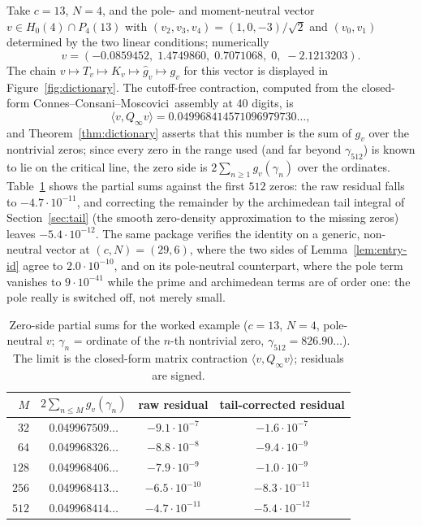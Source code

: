 \documentclass[11pt]{article}
\theoremstyle{plain}
\theoremstyle{definition}
\theoremstyle{remark}
\newcommand{\ccm}{Connes--Consani--Moscovici}
\newcommand{\wh}{\widehat}
\newcommand{\Qinf}{Q_{\infty}}
\begin{document}
Take $c=13$, $N=4$, and the pole- and moment-neutral vector
$v\in H_0(4)\cap P_4(13)$ with $(v_2,v_3,v_4)=(1,0,-3)/\sqrt2$ and
$(v_0,v_1)$ determined by the two linear conditions; numerically
\[
 v=(-0.0859452,\;1.4749860,\;0.7071068,\;0,\;-2.1213203).
\]
The chain $v\mapsto T_v\mapsto K_v\mapsto\wh g_v\mapsto g_v$ for this vector
is displayed in Figure~\ref{fig:dictionary}.  The cutoff-free contraction,
computed from the closed-form \ccm\ assembly at 40 digits, is
\[
 \langle v,\Qinf v\rangle
 =0.049968414571096979730\ldots,
\]
and Theorem~\ref{thm:dictionary} asserts that this number is the sum of
$g_v$ over the nontrivial zeros; since every zero in the range used (and far
beyond $\gamma_{512}$) is known to lie on the critical line, the zero side is
$2\sum_{n\ge1}g_v(\gamma_n)$ over the ordinates.
Table~\ref{tab:zeroside} shows the partial sums against the first $512$
zeros: the raw residual falls to $-4.7\cdot10^{-11}$, and correcting the
remainder by the archimedean tail integral of Section~\ref{sec:tail} (the
smooth zero-density approximation to the missing zeros) leaves
$-5.4\cdot10^{-12}$.  The same package verifies the identity on a generic,
non-neutral vector at $(c,N)=(29,6)$, where the two sides of
Lemma~\ref{lem:entry-id} agree to $2.0\cdot10^{-10}$, and on its pole-neutral
counterpart, where the pole term vanishes to $9\cdot10^{-41}$ while the
prime and archimedean terms are of order one: the pole really is switched
off, not merely small.

\begin{table}[t]
\centering
\begin{tabular}{rccc}
\toprule
$M$ & $2\sum_{n\le M}g_v(\gamma_n)$ & raw residual & tail-corrected residual\\
\midrule
$32$  & $0.049967509\ldots$ & $-9.1\cdot10^{-7}$  & $-1.6\cdot10^{-7}$\\
$64$  & $0.049968326\ldots$ & $-8.8\cdot10^{-8}$  & $-9.4\cdot10^{-9}$\\
$128$ & $0.049968406\ldots$ & $-7.9\cdot10^{-9}$  & $-1.0\cdot10^{-9}$\\
$256$ & $0.049968413\ldots$ & $-6.5\cdot10^{-10}$ & $-8.3\cdot10^{-11}$\\
$512$ & $0.049968414\ldots$ & $-4.7\cdot10^{-11}$ & $-5.4\cdot10^{-12}$\\
\bottomrule
\end{tabular}
\caption{Zero-side partial sums for the worked example
($c=13$, $N=4$, pole-neutral $v$; $\gamma_n$ = ordinate of the $n$-th
nontrivial zero, $\gamma_{512}=826.90\ldots$).  The limit is the closed-form
matrix contraction $\langle v,\Qinf v\rangle$; residuals are signed.}
\label{tab:zeroside}
\end{table}
\end{document}
